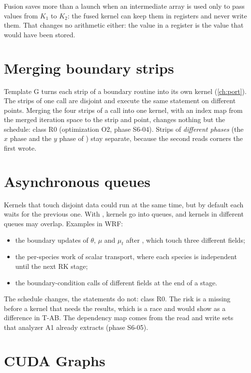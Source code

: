 Fusion saves more than a launch when an intermediate array is used only to pass values from $K_1$ to $K_2$: the fused
kernel can keep them in registers and never write them. That changes no arithmetic either: the value in a register is
the value that would have been stored.

\section{Merging boundary strips}

Template G turns each strip of a boundary routine into its own kernel (\cref{ch:port}). The strips of one call are
disjoint and execute the same statement on different points. Merging the four strips of a call into one kernel, with
an index map from the merged iteration space to the strip and point, changes nothing but the schedule: class R0
(optimization O2, phase S6-04). Strips of \emph{different phases} (the $x$ phase and the $y$ phase of
) stay separate, because the second reads corners the first wrote.

\section{Asynchronous queues}

Kernels that touch disjoint data could run at the same time, but by default each waits for the previous one. With
, kernels go into queues, and kernels in different queues may overlap. Examples in WRF:
\begin{itemize}
  \item the boundary updates of $\theta$, $\mu$ and $\mu_t$ after , which touch three different
    fields;
  \item the per-species work of scalar transport, where each species is independent until the next RK stage;
  \item the boundary-condition calls of different fields at the end of a stage.
\end{itemize}
The schedule changes, the statements do not: class R0. The risk is a missing  before a kernel that needs
the results, which is a race and would show as a difference in T-AB. The dependency map comes from the read and write
sets that analyzer A1 already extracts (phase S6-05).

\section{CUDA Graphs}

